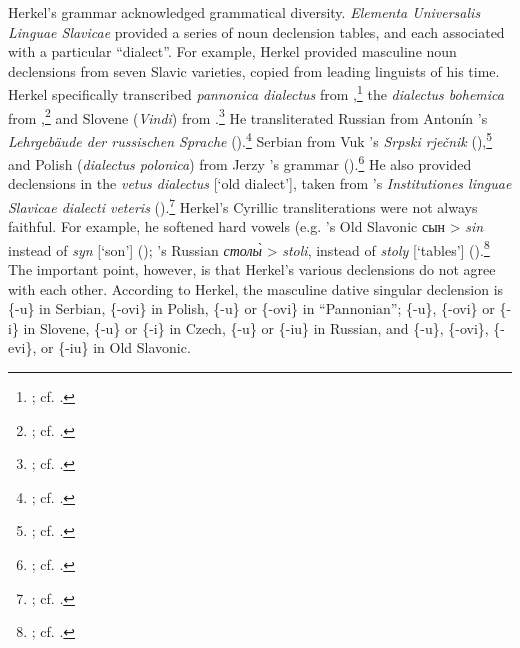 Herkel’s grammar acknowledged grammatical diversity. \textit{Elementa Universalis Linguae Slavicae} provided a series of noun declension tables, and each associated with a particular “dialect”. For example, Herkel provided masculine noun declensions from seven Slavic varieties, copied from leading linguists of his time. Herkel specifically transcribed \textit{pannonica dialectus} from \citet[27--28]{bernolak_grammatica_1790},\footnote{\citet[43--44]{herkel_elementa_1826}; cf. \citet[72--73, 206--207]{herkel_jan_2009}.} the \textit{dialectus bohemica} from \citet[165]{dobrovsky_lehrgebaude_1819},\footnote{\citet[41--42]{herkel_elementa_1826}; cf. \citet[68--71, 206]{herkel_jan_2009}.} and Slovene (\textit{Vindi}) from \citet[232]{kopitar_grammatik_1808}.\footnote{\citet[50]{herkel_elementa_1826}; cf. \citet[78--79, 207]{herkel_jan_2009}.} He transliterated Russian from Antonín \citeauthor{puchmayer_lehrgebaude_1820}’s \citeyear{puchmayer_lehrgebaude_1820} \textit{Lehrgebäude der russischen Sprache} (\citeyear[fold-out between 204--205]{puchmayer_lehrgebaude_1820}).\footnote{\citet[34--35]{herkel_elementa_1826}; cf. \citet[62--63, 206]{herkel_jan_2009}.} Serbian from Vuk \citeauthor{karadzic_srpski_1818}’s \citeyear{karadzic_srpski_1818} \textit{Srpski rječnik} (\citeyear[xxxvii]{karadzic_srpski_1818}),\footnote{\citet[51]{herkel_elementa_1826}; cf. \citet[80--81, 207]{herkel_jan_2009}.} and Polish (\textit{dialectus polo\-nica}) from Jerzy \citeauthor{bandtkie_polnische_1824}’s \citeyear{bandtkie_polnische_1824} grammar (\citeyear[47]{bandtkie_polnische_1824}).\footnote{\citet[38, 90]{herkel_elementa_1826}; cf. \citet[66--67, 206]{herkel_jan_2009}.} He also provided declensions in the \textit{vetus dialectus} [‘old dialect’], taken from \citeauthor{dobrovsky_institutiones_1822}’s \citeyear{dobrovsky_institutiones_1822} \textit{Institutiones linguae Slavicae dialecti veteris} (\citeyear[466, 486]{dobrovsky_institutiones_1822}).\footnote{\citet[29--30]{herkel_elementa_1826}; cf. \citet[56--59, 205]{herkel_jan_2009}.} Herkel’s Cyrillic transliterations were not always faithful. For example, he softened hard vowels (e.g. \citeauthor{dobrovsky_institutiones_1822}’s Old Slavonic {\mono сын} > \textit{sin} instead of \textit{syn} [‘son’] (\citeyear[466]{dobrovsky_institutiones_1822}); \citeauthor{puchmayer_lehrgebaude_1820}’s Russian \textit{столы̀} > \textit{stoli}, instead of \textit{stoly} [‘tables’] (\citeyear[34]{puchmayer_lehrgebaude_1820}).\footnote{\citet[29, 35]{herkel_elementa_1826}; cf. \citet[206]{herkel_jan_2009}.} The important point, however, is that Herkel’s various declensions do not agree with each other. According to Herkel, the masculine dative singular declension is \{-u\} in Serbian, \{-ovi\} in Polish, \{-u\} or \{-ovi\} in “Pannonian”; \{-u\}, \{-ovi\} or \{-i\} in Slovene, \{-u\} or \{-i\} in Czech, \{-u\} or \{-iu\} in Russian, and \{-u\}, \{-ovi\}, \{-evi\}, or \{-iu\} in Old Slavonic.

